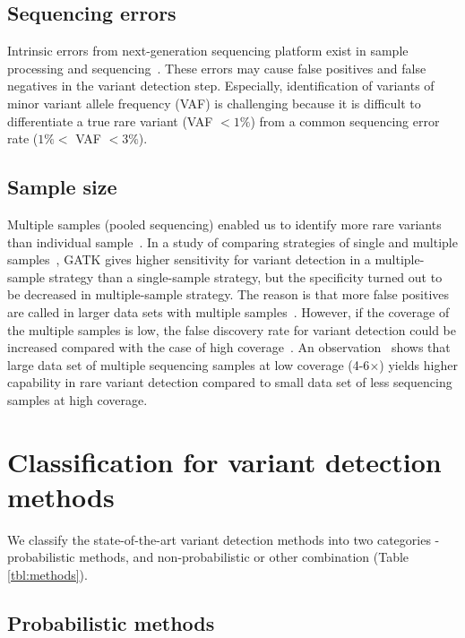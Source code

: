 \documentclass[a4,center,fleqn]{NAR}
\begin{document}
\subsection{Sequencing errors}

Intrinsic errors from next-generation sequencing platform exist in sample processing and sequencing~\citep{Olson2015}.
These errors may cause false positives and false negatives in the variant detection step.
Especially, identification of variants of minor variant allele frequency (VAF) is challenging because it is difficult to differentiate a true rare variant (VAF $<1\%$) from a common sequencing error rate ($1\% <$ VAF $< 3\%$).


\subsection{Sample size}

Multiple samples (pooled sequencing) enabled us to identify more rare variants than individual sample~\citep{Bao2014, liu2012steps}.
In a study of comparing strategies of single and multiple samples~\citep{liu2013variant}, GATK gives higher sensitivity for variant detection in a multiple-sample strategy than a single-sample strategy, but the specificity turned out to be decreased in multiple-sample strategy.
The reason is that more false positives are called in larger data sets with multiple samples~\citep{Nielsen2011}.
However, if the coverage of the multiple samples is low, the false discovery rate for variant detection could be increased compared with the case of high coverage~\citep{Cheng2014}.
An observation~\citep{le2011snp} shows that large data set of multiple sequencing samples at low coverage (4-6$\times$) yields higher capability in rare variant detection compared to small data set of less sequencing samples at high coverage.


\section{Classification for variant detection methods}

We classify the state-of-the-art variant detection methods into two categories - probabilistic methods, and non-probabilistic or other combination (Table \ref{tbl:methods}).



\subsection{Probabilistic methods}
\end{document}
